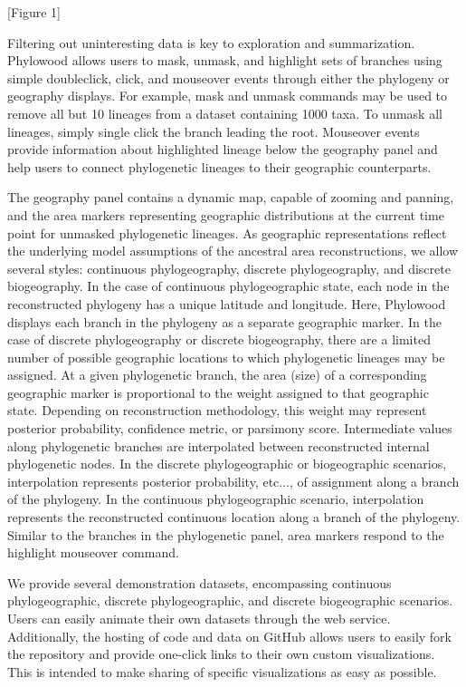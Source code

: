 \documentclass[11pt]{article}
\begin{document}
\begin{center}
[Figure 1]
\end{center}

Filtering out uninteresting data is key to exploration and summarization. Phylowood allows users to mask, unmask, and highlight sets of branches using simple doubleclick, click, and mouseover events through either the phylogeny or geography displays. For example, mask and unmask commands may be used to remove all but 10 lineages from a dataset containing 1000 taxa. To unmask all lineages, simply single click the branch leading the root. Mouseover events provide information about highlighted lineage below the geography panel and help users to connect phylogenetic lineages to their geographic counterparts.

The geography panel contains a dynamic map, capable of zooming and panning, and the area markers representing geographic distributions at the current time point for unmasked phylogenetic lineages. As geographic representations reflect the underlying model assumptions of the ancestral area reconstructions, we allow several styles: continuous phylogeography, discrete phylogeography, and discrete biogeography. In the case of continuous phylogeographic state, each node in the reconstructed phylogeny has a unique latitude and longitude. Here, Phylowood displays each branch in the phylogeny as a separate geographic marker. In the case of discrete phylogeography or discrete biogeography, there are a limited number of possible geographic locations to which phylogenetic lineages may be assigned. At a given phylogenetic branch, the area (size) of a corresponding geographic marker is proportional to the weight assigned to that geographic state. Depending on reconstruction methodology, this weight may represent posterior probability, confidence metric, or parsimony score. Intermediate values along phylogenetic branches are interpolated between reconstructed internal phylogenetic nodes. In the discrete phylogeographic or biogeographic scenarios, interpolation represents posterior probability, etc..., of assignment along a branch of the phylogeny. In the continuous phylogeographic scenario, interpolation represents the reconstructed continuous location along a branch of the phylogeny. Similar to the branches in the phylogenetic panel, area markers respond to the highlight mouseover command.

We provide several demonstration datasets, encompassing continuous phylogeographic, discrete phylogeographic, and discrete biogeographic scenarios. Users can easily animate their own datasets through the web service. Additionally, the hosting of code and data on GitHub allows users to easily fork the repository and provide one-click links to their own custom visualizations. This is intended to make sharing of specific visualizations as easy as possible.
\end{document}
